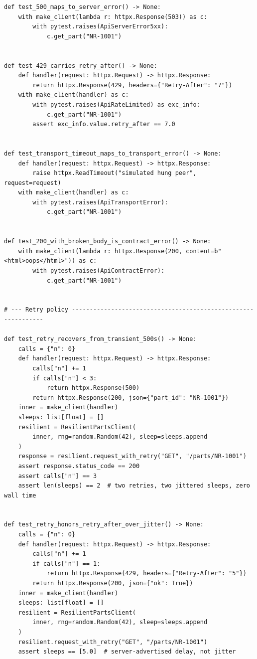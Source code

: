 \begin{verbatim}
def test_500_maps_to_server_error() -> None:
    with make_client(lambda r: httpx.Response(503)) as c:
        with pytest.raises(ApiServerError5xx):
            c.get_part("NR-1001")


def test_429_carries_retry_after() -> None:
    def handler(request: httpx.Request) -> httpx.Response:
        return httpx.Response(429, headers={"Retry-After": "7"})
    with make_client(handler) as c:
        with pytest.raises(ApiRateLimited) as exc_info:
            c.get_part("NR-1001")
        assert exc_info.value.retry_after == 7.0


def test_transport_timeout_maps_to_transport_error() -> None:
    def handler(request: httpx.Request) -> httpx.Response:
        raise httpx.ReadTimeout("simulated hung peer", request=request)
    with make_client(handler) as c:
        with pytest.raises(ApiTransportError):
            c.get_part("NR-1001")


def test_200_with_broken_body_is_contract_error() -> None:
    with make_client(lambda r: httpx.Response(200, content=b"<html>oops</html>")) as c:
        with pytest.raises(ApiContractError):
            c.get_part("NR-1001")


# --- Retry policy --------------------------------------------------------------

def test_retry_recovers_from_transient_500s() -> None:
    calls = {"n": 0}
    def handler(request: httpx.Request) -> httpx.Response:
        calls["n"] += 1
        if calls["n"] < 3:
            return httpx.Response(500)
        return httpx.Response(200, json={"part_id": "NR-1001"})
    inner = make_client(handler)
    sleeps: list[float] = []
    resilient = ResilientPartsClient(
        inner, rng=random.Random(42), sleep=sleeps.append
    )
    response = resilient.request_with_retry("GET", "/parts/NR-1001")
    assert response.status_code == 200
    assert calls["n"] == 3
    assert len(sleeps) == 2  # two retries, two jittered sleeps, zero wall time


def test_retry_honors_retry_after_over_jitter() -> None:
    calls = {"n": 0}
    def handler(request: httpx.Request) -> httpx.Response:
        calls["n"] += 1
        if calls["n"] == 1:
            return httpx.Response(429, headers={"Retry-After": "5"})
        return httpx.Response(200, json={"ok": True})
    inner = make_client(handler)
    sleeps: list[float] = []
    resilient = ResilientPartsClient(
        inner, rng=random.Random(42), sleep=sleeps.append
    )
    resilient.request_with_retry("GET", "/parts/NR-1001")
    assert sleeps == [5.0]  # server-advertised delay, not jitter



\end{verbatim}
